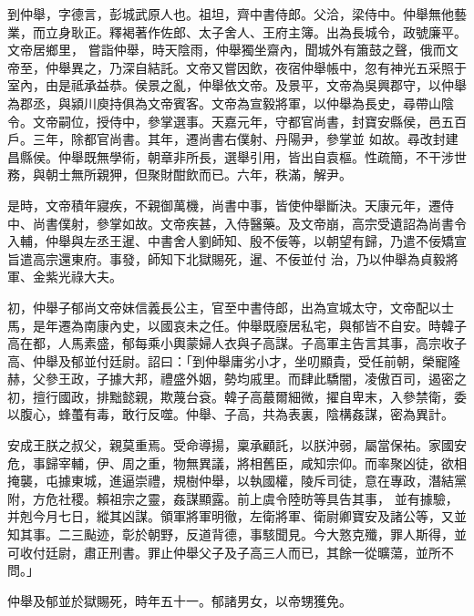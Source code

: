 
\begin{pinyinscope}

 到仲舉，字德言，彭城武原人也。祖坦，齊中書侍郎。父洽，梁侍中。仲舉無他藝業，而立身耿正。釋褐著作佐郎、太子舍人、王府主簿。出為長城令，政號廉平。文帝居鄉里，
 嘗詣仲舉，時天陰雨，仲舉獨坐齋內，聞城外有簫鼓之聲，俄而文帝至，仲舉異之，乃深自結託。文帝又嘗因飲，夜宿仲舉帳中，忽有神光五采照于室內，由是祗承益恭。侯景之亂，仲舉依文帝。及景平，文帝為吳興郡守，以仲舉為郡丞，與潁川庾持俱為文帝賓客。文帝為宣毅將軍，以仲舉為長史，尋帶山陰令。文帝嗣位，授侍中，參掌選事。天嘉元年，守都官尚書，封寶安縣侯，邑五百戶。三年，除都官尚書。其年，遷尚書右僕射、丹陽尹，參掌並
 如故。尋改封建昌縣侯。仲舉既無學術，朝章非所長，選舉引用，皆出自袁樞。性疏簡，不干涉世務，與朝士無所親狎，但聚財酣飲而已。六年，秩滿，解尹。



 是時，文帝積年寢疾，不親御萬機，尚書中事，皆使仲舉斷決。天康元年，遷侍中、尚書僕射，參掌如故。文帝疾甚，入侍醫藥。及文帝崩，高宗受遺詔為尚書令入輔，仲舉與左丞王暹、中書舍人劉師知、殷不佞等，以朝望有歸，乃遣不佞矯宣旨遣高宗還東府。事發，師知下北獄賜死，暹、不佞並付
 治，乃以仲舉為貞毅將軍、金紫光祿大夫。



 初，仲舉子郁尚文帝妹信義長公主，官至中書侍郎，出為宣城太守，文帝配以士馬，是年遷為南康內史，以國哀未之任。仲舉既廢居私宅，與郁皆不自安。時韓子高在都，人馬素盛，郁每乘小輿蒙婦人衣與子高謀。子高軍主告言其事，高宗收子高、仲舉及郁並付廷尉。詔曰：「到仲舉庸劣小才，坐叨顯貴，受任前朝，榮寵隆赫，父參王政，子據大邦，禮盛外姻，勢均戚里。而肆此驕闇，凌傲百司，遏密之
 初，擅行國政，排黜懿親，欺蔑台袞。韓子高蕞爾細微，擢自卑末，入參禁衛，委以腹心，蜂蠆有毒，敢行反噬。仲舉、子高，共為表裏，陰構姦謀，密為異計。



 安成王朕之叔父，親莫重焉。受命導揚，稟承顧託，以朕沖弱，屬當保祐。家國安危，事歸宰輔，伊、周之重，物無異議，將相舊臣，咸知宗仰。而率聚凶徒，欲相掩襲，屯據東城，進逼崇禮，規樹仲舉，以執國權，陵斥司徒，意在專政，潛結黨附，方危社稷。賴祖宗之靈，姦謀顯露。前上虞令陸昉等具告其事，
 並有據驗，并剋今月七日，縱其凶謀。領軍將軍明徹，左衛將軍、衛尉卿寶安及諸公等，又並知其事。二三颭迹，彰於朝野，反道背德，事駭聞見。今大憝克殲，罪人斯得，並可收付廷尉，肅正刑書。罪止仲舉父子及子高三人而已，其餘一從曠蕩，並所不問。」



 仲舉及郁並於獄賜死，時年五十一。郁諸男女，以帝甥獲免。




\end{pinyinscope}
